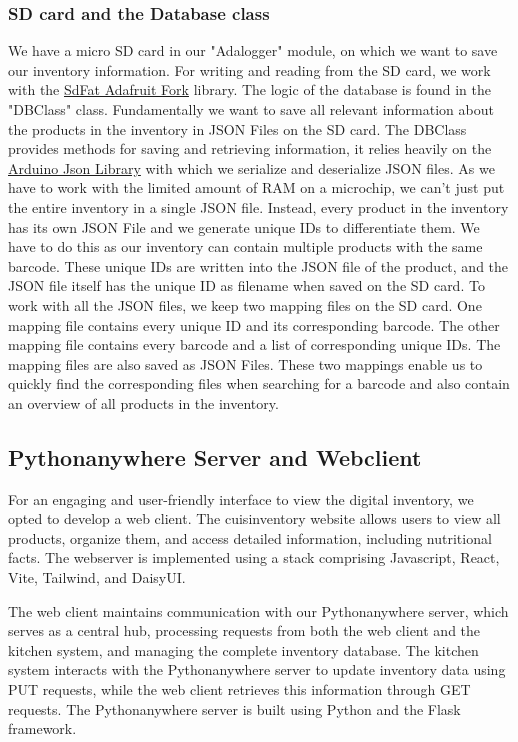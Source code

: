 \documentclass{article}
\begin{document}
\subsubsection{SD card and the Database class}
We have a micro SD card in our "Adalogger" module, on which we want to save our inventory information.
For writing and reading from the SD card, we work with the \href{https://github.com/adafruit/SdFat}{SdFat Adafruit Fork} library.
The logic of the database is found in the "DBClass" class. Fundamentally we want to save all relevant information about the products in the inventory in JSON Files on the SD card.
The DBClass provides methods for saving and retrieving information, it relies heavily on the \href{https://github.com/bblanchon/ArduinoJson}{Arduino Json Library} with which we serialize and deserialize JSON files.
As we have to work with the limited amount of RAM on a microchip, we can't just put the entire inventory in a single JSON file.
Instead, every product in the inventory has its own JSON File and we generate unique IDs to differentiate them. We have to do this as our inventory can contain multiple products with the same barcode.
These unique IDs are written into the JSON file of the product, and the JSON file itself has the unique ID as filename when saved on the SD card.
To work with all the JSON files, we keep two mapping files on the SD card. One mapping file contains every unique ID and its corresponding barcode.
The other mapping file contains every barcode and a list of corresponding unique IDs. The mapping files are also saved as JSON Files.
These two mappings enable us to quickly find the corresponding files when searching for a barcode and also contain an overview of all products in the inventory.

\subsection{Pythonanywhere Server and Webclient}
For an engaging and user-friendly interface to view the digital inventory, we opted to develop a web client. The cuisinventory website allows users to view all products, organize them, and access detailed information, including nutritional facts. The webserver is implemented using a stack comprising Javascript, React, Vite, Tailwind, and DaisyUI.

The web client maintains communication with our Pythonanywhere server, which serves as a central hub, processing requests from both the web client and the kitchen system, and managing the complete inventory database. The kitchen system interacts with the Pythonanywhere server to update inventory data using PUT requests, while the web client retrieves this information through GET requests. The Pythonanywhere server is built using Python and the Flask framework.
\end{document}
